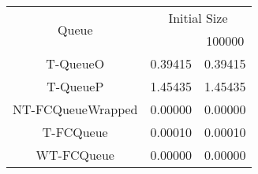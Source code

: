 \begin{tabular}{|c|c|c|}
\hline
\multirow{2}{*}{Queue} & \multicolumn{2}{c|}{Initial Size}\\\cline{2-3}& \qquad 10000 \qquad\quad & 100000\\
\hline
\hline
T-QueueO & 0.39415 & 0.39415\\
T-QueueP & 1.45435 & 1.45435\\
NT-FCQueueWrapped & 0.00000 & 0.00000\\
T-FCQueue & 0.00010 & 0.00010\\
WT-FCQueue & 0.00000 & 0.00000\\
\hline\end{tabular}
